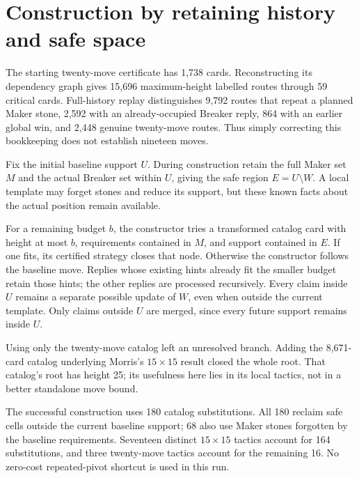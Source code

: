 \documentclass[11pt]{amsart}
\begin{document}
\section{Construction by retaining history and safe space}
The starting twenty-move certificate has 1,738 cards. Reconstructing its
dependency graph gives 15,696 maximum-height labelled routes through 59
critical cards. Full-history replay distinguishes 9,792 routes that repeat
a planned Maker stone, 2,592 with an already-occupied Breaker reply, 864 with
an earlier global win, and 2,448 genuine twenty-move routes. Thus simply
correcting this bookkeeping does not establish nineteen moves.

Fix the initial baseline support $U$. During construction retain the full
Maker set $M$ and the actual Breaker set within $U$, giving the safe region
$E=U\setminus W$. A local template may forget stones and reduce its support,
but these known facts about the actual position remain available.

For a remaining budget $b$, the constructor tries a transformed catalog card
with height at most $b$, requirements contained in $M$, and support contained
in $E$. If one fits, its certified strategy closes that node. Otherwise the
constructor follows the baseline move. Replies whose existing hints already
fit the smaller budget retain those hints; the other replies are processed
recursively. Every claim inside $U$ remains a separate possible update of
$W$, even when outside the current template. Only claims outside $U$ are
merged, since every future support remains inside $U$.

Using only the twenty-move catalog left an unresolved branch. Adding the
8,671-card catalog underlying Morris's $15\times15$ result closed the whole
root. That catalog's root has height 25; its usefulness here lies in its local
tactics, not in a better standalone move bound.

The successful construction uses 180 catalog substitutions. All 180 reclaim
safe cells outside the current baseline support; 68 also use Maker stones
forgotten by the baseline requirements. Seventeen distinct $15\times15$
tactics account for 164 substitutions, and three twenty-move tactics account
for the remaining 16. No zero-cost repeated-pivot shortcut is used in this run.
\end{document}
